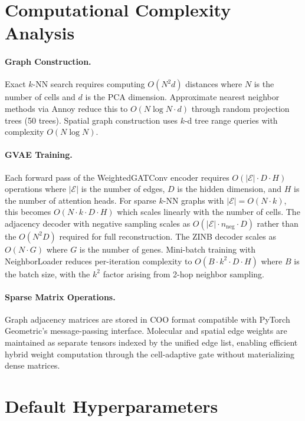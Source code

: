 \documentclass{article}
\begin{document}
\appendix
\section{Computational Complexity Analysis}

\paragraph{Graph Construction.}
Exact $k$-NN search requires computing $O(N^2 d)$ distances where $N$ is the number of cells and $d$ is the PCA dimension. Approximate nearest neighbor methods via Annoy reduce this to $O(N \log N \cdot d)$ through random projection trees (50 trees). Spatial graph construction uses $k$-d tree range queries with complexity $O(N \log N)$.

\paragraph{GVAE Training.}
Each forward pass of the WeightedGATConv encoder requires $O(|\mathcal{E}| \cdot D \cdot H)$ operations where $|\mathcal{E}|$ is the number of edges, $D$ is the hidden dimension, and $H$ is the number of attention heads. For sparse $k$-NN graphs with $|\mathcal{E}| = O(N \cdot k)$, this becomes $O(N \cdot k \cdot D \cdot H)$ which scales linearly with the number of cells. The adjacency decoder with negative sampling scales as $O(|\mathcal{E}| \cdot n_{\text{neg}} \cdot D)$ rather than the $O(N^2 D)$ required for full reconstruction. The ZINB decoder scales as $O(N \cdot G)$ where $G$ is the number of genes. Mini-batch training with NeighborLoader reduces per-iteration complexity to $O(B \cdot k^2 \cdot D \cdot H)$ where $B$ is the batch size, with the $k^2$ factor arising from 2-hop neighbor sampling.

\paragraph{Sparse Matrix Operations.}
Graph adjacency matrices are stored in COO format compatible with PyTorch Geometric's message-passing interface. Molecular and spatial edge weights are maintained as separate tensors indexed by the unified edge list, enabling efficient hybrid weight computation through the cell-adaptive gate without materializing dense matrices.

\section{Default Hyperparameters}
\end{document}
